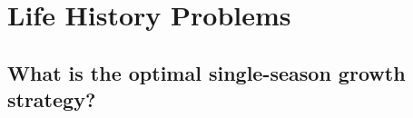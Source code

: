 \documentclass{article}
\begin{document}







\section{Life History Problems}
\label{sec:problems}


\subsection{What is the optimal single-season growth strategy?}
\label{sec:mirmirani1978-single}
\end{document}

